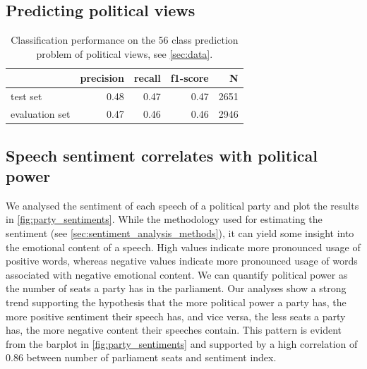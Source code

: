 \documentclass[runningheads,a4paper]{llncs}
\begin{document}
\subsection{Predicting political views}

\begin{table}[t]
\begin{center}
\begin{tabular}{lrrrr}
    &         precision    &recall &  f1-score  & N\\
\hline\hline
test set    &  0.48   &   0.47  &    0.47  &    2651\\
evaluation set    &  0.47    &  0.46 &     0.46 &     2946\\
%
\end{tabular}
\end{center}
\caption{
\label{tab:results_avg_political_view}
Classification performance on the 56 class prediction problem of political views, see \autoref{sec:data}.
}
\end{table}

\subsection{Speech sentiment correlates with political power}\label{sec:sentiment_result}
We analysed the sentiment of each speech of a political party and plot the results in \autoref{fig:party_sentiments}. While the methodology used for estimating the sentiment (see \autoref{sec:sentiment_analysis_methods}), it can yield some insight into the emotional content of a speech. High values indicate more pronounced usage of positive words, whereas negative values indicate more pronounced usage of words associated with negative emotional content. We can quantify political power as the number of seats a party has in the parliament. Our analyses show a strong trend supporting the hypothesis that the more political power a party has, the more positive sentiment their speech has, and vice versa, the less seats a party has, the more negative content their speeches contain. This pattern is evident from the barplot in \autoref{fig:party_sentiments} and supported by a high correlation of 0.86 between number of parliament seats and sentiment index.
\end{document}
